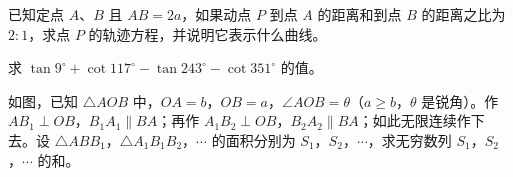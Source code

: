 \begin{question}
已知定点 $A$、$B$ 且 $AB=2a$，如果动点 $P$ 到点 $A$ 的距离和到点 $B$ 的距离之比为 $2:1$，求点 $P$ 的轨迹方程，并说明它表示什么曲线。

\end{question}
\begin{question}
求 $\tan 9^\circ+\cot 117^\circ-\tan 243^\circ-\cot 351^\circ$ 的值。

\Needspace{0.4\textheight}
\end{question}
\begin{question}
如图，已知 $\triangle AOB$ 中，$OA=b$，$OB=a$，$\angle AOB=\theta$（$a\ge b$，$\theta$ 是锐角）。作 $AB_1\perp OB$，$B_1A_1\parallel BA$；再作 $A_1B_2\perp OB$，$B_2A_2\parallel BA$；如此无限连续作下去。设 $\triangle ABB_1$，$\triangle A_1B_1B_2$，$\cdots$ 的面积分别为 $S_1$，$S_2$，$\cdots$，求无穷数列 $S_1$，$S_2$，$\cdots$ 的和。
\nopagebreak[4]
\begin{center}\end{center}
\nopagebreak[4]

\end{question}